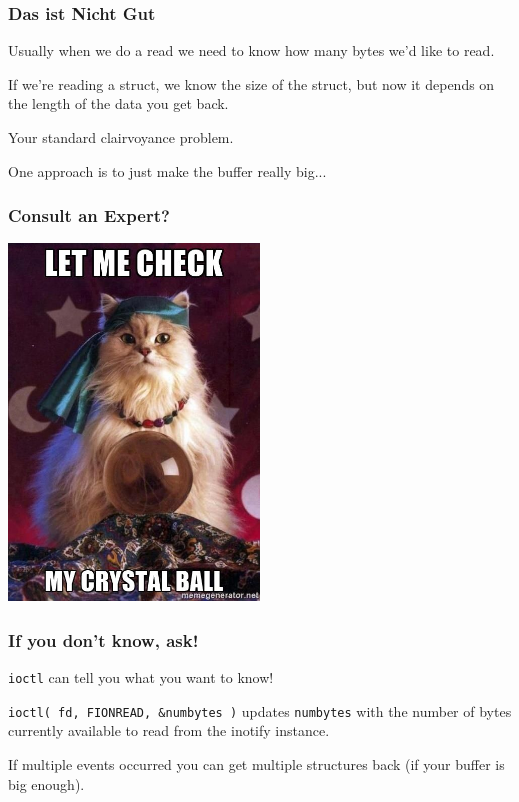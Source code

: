 \begin{frame}
	\frametitle{Das ist Nicht Gut}

	Usually when we do a read we need to know how many bytes we'd like to read.

	If we're reading a struct, we know the size of the struct, but now it depends on the length of the data you get back.

	Your standard clairvoyance problem.

	One approach is to just make the buffer really big...

\end{frame}


\begin{frame}
	\frametitle{Consult an Expert?}

	\begin{center}
		\includegraphics[width=0.5\textwidth]{images/clairvoyance.jpg}
	\end{center}

\end{frame}



\begin{frame}
	\frametitle{If you don't know, ask!}

	\texttt{ioctl} can tell you what you want to know!

	\texttt{ioctl( fd, FIONREAD, \&numbytes )} updates \texttt{numbytes} with the number of bytes currently available to read from the inotify instance.

	If multiple events occurred you can get multiple structures back (if your buffer is big enough).


\end{frame}

